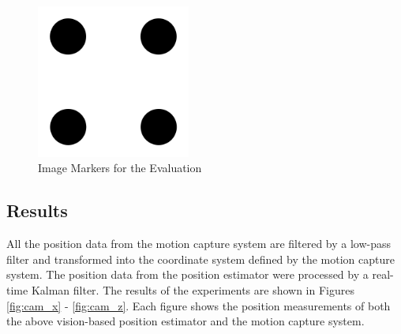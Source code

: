 \begin{figure}
    \centering
    \includegraphics[width=0.45\textwidth]{graphics/markers.png}
    \caption{Image Markers for the Evaluation}
    \label{fig:markers}
\end{figure}

\subsection{Results}
All the position data from the motion capture system are filtered by a low-pass filter and transformed into the coordinate system defined by the motion capture system. The position data from the position estimator were processed by a real-time Kalman filter. The results of the experiments are shown in Figures \ref{fig:cam_x} - \ref{fig:cam_z}. Each figure shows the position measurements of both the above vision-based position estimator and the motion capture system.

